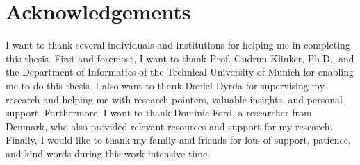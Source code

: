\chapter{Acknowledgements}

I want to thank several individuals and institutions for helping me in completing this thesis. First and foremost, I want to thank Prof. Gudrun Klinker, Ph.D., and the Department of Informatics of the Technical University of Munich for enabling me to do this thesis. I also want to thank Daniel Dyrda for supervising my research and helping me with research pointers, valuable insights, and personal support. Furthermore, I want to thank Dominic Ford, a researcher from Denmark, who also provided relevant resources and support for my research. Finally, I would like to thank my family and friends for lots of support, patience, and kind words during this work-intensive time.
